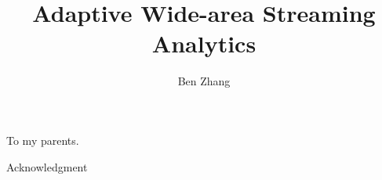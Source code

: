 \documentclass[12pt, oneside]{ucbthesis}
\begin{document}
\title{Adaptive Wide-area Streaming Analytics}
\author{Ben Zhang}
\prevdegrees{}



\begin{frontmatter}
\maketitle
\approvalpage
\copyrightpage
\abstract

\endabstract

\end{frontmatter}
\begin{optionalFrontMatter}
\begin{dedication}
  \vspace*{\fill}
  To my parents.
  \vspace*{\fill}
\end{dedication}
\end{optionalFrontMatter}

\tableofcontents
\listoffigures
\listoftables

\begin{acknowledgements}
  \thispagestyle{plain}
  Acknowledgment
% 
\end{acknowledgements}

\begin{dissertationText}



\ssp



\appendix

\end{dissertationText}
\end{document}
